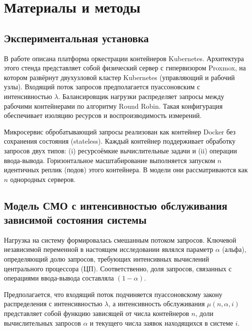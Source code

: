 \documentclass[12pt,a4paper]{article}
\begin{document}
\section{Материалы и методы}
\label{sec:methods}

\subsection{Экспериментальная установка}

В работе \cite{мельничук2026анализ} описана платформа оркестрации контейнеров Kubernetes. Архитектура этого стенда представляет собой физический сервер с гипервизором Proxmox, на котором развёрнут двухузловой кластер Kubernetes (управляющий и рабочий узлы). Входящий поток запросов предполагается пуассоновским с интенсивностью $\lambda$. Балансировщик нагрузки распределяет запросы между рабочими контейнерами по алгоритму Round Robin. Такая конфигурация обеспечивает изоляцию ресурсов и воспроизводимость измерений.

Микросервис обробатывающий запросы реализован как контейнер Docker без сохранения состояния (stateless). Каждый контейнер поддерживает обработку запросов двух типов: (i) ресурсоёмкие вычислительные задачи и (ii) операции ввода-вывода. Горизонтальное масштабирование выполняется запуском $n$ идентичных реплик (подов) этого контейнера. В модели они рассматриваются как $n$ однородных серверов.

\subsection{Модель СМО с интенсивностью обслуживания зависимой состояния системы}

Нагрузка на систему формировалась смешанным потоком запросов. Ключевой независимой переменной в настоящем исследовании являлся параметр $\alpha$ (альфа), определяющий долю запросов, требующих интенсивных вычислений центрального процессора (ЦП). Соответственно, доля запросов, связанных с операциями ввода-вывода составляла $(1-\alpha)$.

Предполагается, что входящий поток подчиняется пуассоновскому закону распределения с интенсивностью $\lambda$, а интенсивность обслуживания $\mu(n,\alpha,i)$ представляет собой функцию зависящей от числа контейнеров $n$, доли вычислительных запросов $\alpha$ и текущего числа заявок находящихся в системе $i$.
\end{document}
